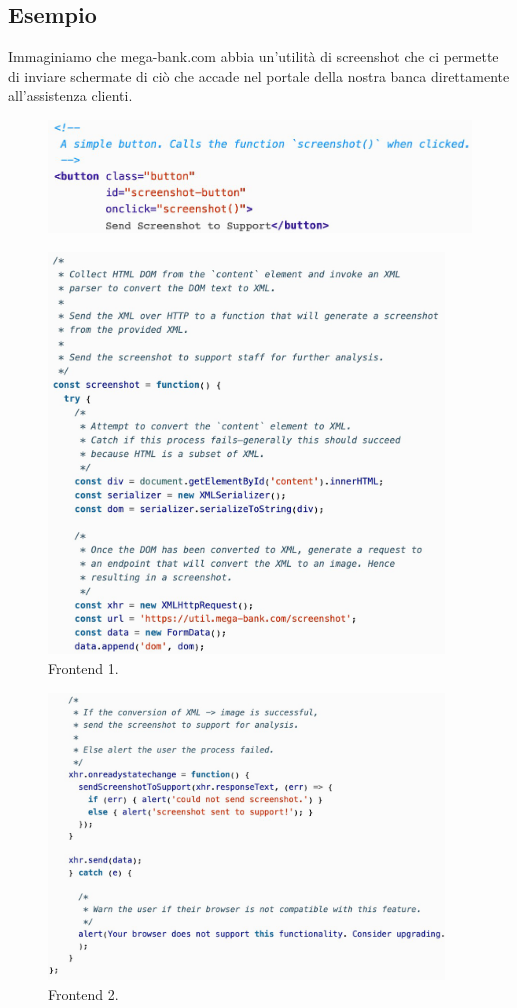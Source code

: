 \subsection{Esempio}
Immaginiamo che mega-bank.com abbia un'utilità di screenshot che ci permette di inviare schermate di ciò che accade nel portale della nostra banca direttamente all'assistenza clienti.

\begin{figure}[H]
	\centering
	\includegraphics[width=12cm, keepaspectratio]{capitoli/web_security/imgs/xxe_banca_1.png}
	\label{fig:xxe_banca_1}
\end{figure}

\begin{figure}[H]
	\centering
	\includegraphics[width=10.5cm, keepaspectratio]{capitoli/web_security/imgs/xxe_banca_2.png}
	\caption{Frontend 1.}
	\label{fig:xxe_banca_2}
\end{figure}

\begin{figure}[H]
	\centering
	\includegraphics[width=10.5cm, keepaspectratio]{capitoli/web_security/imgs/xxe_banca_3.png}
	\caption{Frontend 2.}
	\label{fig:xxe_banca_3}
\end{figure}

